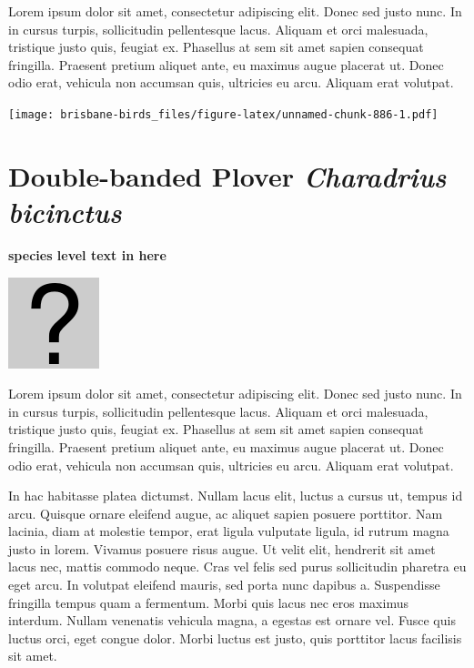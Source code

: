 \documentclass[]{book}
\let\origfigure\figure
\let\endorigfigure\endfigure
\renewenvironment{figure}[1][2] {
  \expandafter\origfigure\expandafter[H]
} {
  \endorigfigure
}
\begin{document}
Lorem ipsum dolor sit amet, consectetur adipiscing elit. Donec sed justo
nunc. In in cursus turpis, sollicitudin pellentesque lacus. Aliquam et
orci malesuada, tristique justo quis, feugiat ex. Phasellus at sem sit
amet sapien consequat fringilla. Praesent pretium aliquet ante, eu
maximus augue placerat ut. Donec odio erat, vehicula non accumsan quis,
ultricies eu arcu. Aliquam erat volutpat.

\texttt{[image: brisbane-birds\_files/figure-latex/unnamed-chunk-886-1.pdf]}

\section{\texorpdfstring{Double-banded Plover \emph{Charadrius
bicinctus}}{Double-banded Plover Charadrius bicinctus}}\label{double-banded-plover-charadrius-bicinctus}

\textbf{species level text in here}

\begin{figure}
\centering
\includegraphics{assets/missing.png}
\caption{No image for species}
\end{figure}

Lorem ipsum dolor sit amet, consectetur adipiscing elit. Donec sed justo
nunc. In in cursus turpis, sollicitudin pellentesque lacus. Aliquam et
orci malesuada, tristique justo quis, feugiat ex. Phasellus at sem sit
amet sapien consequat fringilla. Praesent pretium aliquet ante, eu
maximus augue placerat ut. Donec odio erat, vehicula non accumsan quis,
ultricies eu arcu. Aliquam erat volutpat.

In hac habitasse platea dictumst. Nullam lacus elit, luctus a cursus ut,
tempus id arcu. Quisque ornare eleifend augue, ac aliquet sapien posuere
porttitor. Nam lacinia, diam at molestie tempor, erat ligula vulputate
ligula, id rutrum magna justo in lorem. Vivamus posuere risus augue. Ut
velit elit, hendrerit sit amet lacus nec, mattis commodo neque. Cras vel
felis sed purus sollicitudin pharetra eu eget arcu. In volutpat eleifend
mauris, sed porta nunc dapibus a. Suspendisse fringilla tempus quam a
fermentum. Morbi quis lacus nec eros maximus interdum. Nullam venenatis
vehicula magna, a egestas est ornare vel. Fusce quis luctus orci, eget
congue dolor. Morbi luctus est justo, quis porttitor lacus facilisis sit
amet.
\end{document}
